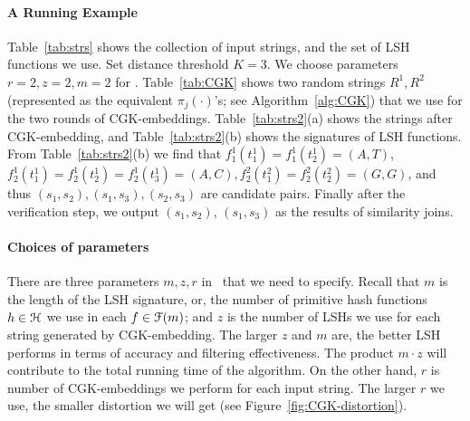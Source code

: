 
\paragraph{A Running Example}  
Table~\ref{tab:strs} shows the collection of input strings, and the set of LSH functions we use. Set distance threshold $K=3$. We choose parameters $r=2, z=2, m=2$ for \ebdjoin.  
Table~\ref{tab:CGK} shows two random strings $R^1, R^2$ (represented as the equivalent $\pi_j(\cdot)$'s; see Algorithm~\ref{alg:CGK}) that we use for the two rounds of CGK-embeddings. Table~\ref{tab:strs2}(a) shows the strings after CGK-embedding, and Table~\ref{tab:strs2}(b) shows the signatures of LSH functions. From Table~\ref{tab:strs2}(b) we find that $f_1^1(t_1^1)=f_1^1(t_2^1)=(A,T)$, $f_2^1(t_1^1)=f_2^1(t_2^1)=f_2^1(t_3^1)=(A,C), f_2^2(t_1^2)=f_2^2(t_2^2)=(G,G)$, and thus $ (s_1,s_2),(s_1,s_3),(s_2,s_3)$ are candidate pairs.  Finally after the verification step, we output $(s_1,s_2)$, $(s_1,s_3)$ as the results of similarity joins. 

\paragraph{Choices of parameters}  There are three parameters $m, z, r$ in \ebdjoin\ that we need to specify.  Recall that $m$ is the length of the LSH signature, or, the number of primitive hash functions $h \in \mathcal{H}$ we use in each $f \in \mathcal{F}(m)$; and $z$ is the number of LSHs we use for each string generated by CGK-embedding.  The larger $z$ and $m$ are, the better LSH performs in terms of accuracy and filtering effectiveness.  The product $m \cdot z$ will contribute to the total running time of the algorithm.  On the other hand, $r$ is number of CGK-embeddings we perform for each input string.  The larger $r$ we use, the smaller distortion we will get (see Figure~\ref{fig:CGK-distortion}).  


